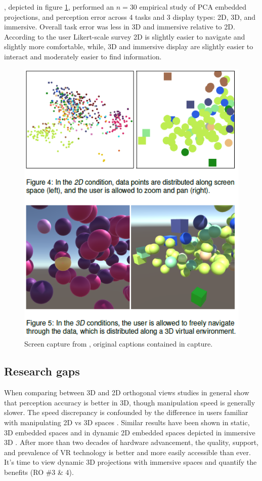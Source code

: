 \documentclass{monashthesis}
\begin{document}
\textcite{wagner_filho_immersive_2018}, depicted in figure
\ref{fig:wagner18fig}, performed an \(n=30\) empirical study of PCA
embedded projections, and perception error across 4 tasks and 3 display
types: 2D, 3D, and immersive. Overall task error was less in 3D and
immersive relative to 2D. According to the user Likert-scale survey 2D
is slightly easier to navigate and slightly more comfortable, while, 3D
and immersive display are slightly easier to interact and moderately
easier to find information.





\begin{figure}

{\centering \includegraphics[width=0.5\linewidth]{./figures/wagner18fig} 

}

\caption{Screen capture from
\textcite{wagner_filho_immersive_2018}, original captions contained in
capture.}\label{fig:wagner18fig}
\end{figure}

\subsection{Research gaps}\label{research-gaps-1}

When comparing between 3D and 2D orthogonal views studies in general
show that perception accuracy is better in 3D, though manipulation speed
is generally slower. The speed discrepancy is confounded by the
difference in users familiar with manipulating 2D vs 3D spaces
\autocites{lee_effects_1986}{wickens_implications_1994}{tory_visualization_2006}[counter
example][]{sedlmair_empirical_2013}. Similar results have been shown in
static, 3D embedded spaces
\autocites{gracia_new_2016}{wagner_filho_immersive_2018} and in dynamic
2D embedded spaces depicted in immersive 3D
\autocite{nelson_xgobi_1998}. After more than two decades of hardware
advancement, the quality, support, and prevalence of VR technology is
better and more easily accessible than ever. It's time to view dynamic
3D projections with immersive spaces and quantify the benefits (RO \#3
\& 4).
\end{document}
